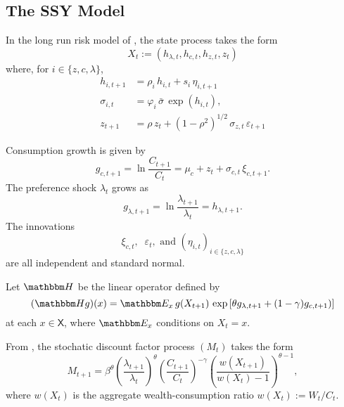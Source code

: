 \documentclass[12pt, reqno]{amsart}
\newcommand{\1}{\mathbbm 1}
\newcommand{\HH}{\mathbbm H}
\newcommand{\EE}{\mathbbm E}
\newcommand{\XX}{\mathsf X}
\renewcommand{\phi}{\varphi}
\renewcommand{\epsilon}{\varepsilon}
\theoremstyle{plain}
\theoremstyle{definition}
\begin{document}
\subsection{The SSY Model}

In the long run risk model of \cite{schorfheide2018identifying}, the state
process takes the form 
%
\begin{equation*}
    X_t := (h_{\lambda, t}, h_{c, t}, h_{z, t}, z_t)  
\end{equation*}
%
where, for $i \in \{z, c, \lambda\}$,
%
\begin{align*}
    h_{i, t+1}
        & = \rho_i \, h_{i,t} + s_{i} \, \eta_{i, t+1}
        \\
    \sigma_{i,t} 
        & = \phi_i \, \bar{\sigma} \, \exp(h_{i,t}),
        \\
    z_{t+1} 
        & = \rho \, z_t + (1 - \rho^2)^{1/2} \, 
                \sigma_{z, t} \, \epsilon_{t+1}
\end{align*}
%


Consumption growth is given by 
%
\begin{equation}\label{eq:ssygc}
    g_{c, t+1}
    = \ln \frac{C_{t+1}}{C_t} 
    = \mu_c + z_t + \sigma_{c, t} \, \xi_{c, t+1} .
\end{equation}
%
The preference shock $\lambda_t$ grows as
%
\begin{equation*}
    g_{\lambda, t+1}
    = \ln \frac{\lambda_{t+1}}{\lambda_t} 
    = h_{\lambda, t+1}.
\end{equation*}
%
The innovations 
%
\begin{equation*}
    \xi_{c, t}, \;\;  \epsilon_t, \text{ and } (\eta_{i, t})_{i \in \{z, c, \lambda\}}
\end{equation*}
%
are all independent and standard normal.  

Let $\HH$ be the linear operator defined by
%
\begin{equation}\label{eq:defk}
    (\HH g)(x) = \EE_x 
        \, g(X_{t+1})  \,
        \exp
        \left[ 
            \theta g_{\lambda, t+1} + (1-\gamma) g_{c, t+1})
        \right]
\end{equation}
%
at each $x \in \XX$,  where $\EE_x$ conditions on $X_t = x$.


From \cite{schorfheide2018identifying}, the stochatic discount factor process
$(M_t)$ takes the form
%
\begin{equation}\label{eq:ssysdf}
    M_{t+1} = 
    \beta^\theta
    \left(\frac{\lambda_{t+1}}{\lambda_t} \right)^\theta
    \left(\frac{C_{t+1}}{C_t} \right)^{-\gamma}
    \left(\frac{w(X_{t+1})}{w(X_t) - 1} \right)^{\theta - 1},
\end{equation}
%
where $w(X_t)$ is the aggregate wealth-consumption ratio $w(X_t) := W_t / C_t$. 
\end{document}

